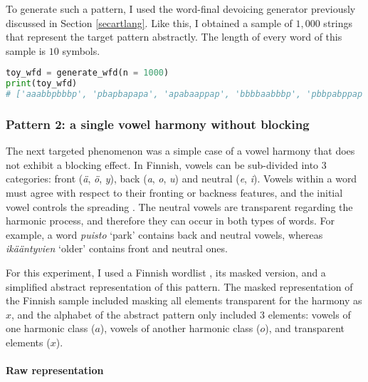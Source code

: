 To generate such a pattern, I used the word-final devoicing generator previously discussed in Section \ref{secartlang}.
Like this, I obtained a sample of $1,000$ strings that represent the target pattern abstractly.
The length of every word of this sample is $10$ symbols.

\begin{lstlisting}[language=Python]
toy_wfd = generate_wfd(n = 1000)
print(toy_wfd)
# ['aaabbpbbbp', 'pbapbapapa', 'apabaappap', 'bbbbaabbbp', 'pbbpabppap', ...]
\end{lstlisting}


\subsubsection{Pattern 2: a single vowel harmony without blocking}

The next targeted phenomenon was a simple case of a vowel harmony that does not exhibit a blocking effect.
In Finnish, vowels can be sub-divided into $3$ categories: front (\emph{\"a}, \emph{\"o}, \emph{y}), back (\emph{a}, \emph{o}, \emph{u}) and neutral (\emph{e}, \emph{i}).
Vowels within a word must agree with respect to their fronting or backness features, and the initial vowel controls the spreading \citep{RoseWalker2011}.
The neutral vowels are transparent regarding the harmonic process, and therefore they can occur in both types of words.
For example, a word \emph{puisto} `park' contains back and neutral vowels, whereas \emph{ik\"a\"antyvien} `older' contains front and neutral ones.

For this experiment, I used a Finnish wordlist \href{https://github.com/douglasbuzatto/WordLists}{\faGithub} \citep{GHdouglasbuzatto}, its masked version, and a simplified abstract representation of this pattern.
The masked representation of the Finnish sample included masking all elements transparent for the harmony as $x$, and the alphabet of the abstract pattern only included $3$ elements: vowels of one harmonic class ($a$), vowels of another harmonic class ($o$), and transparent elements ($x$).


\paragraph{Raw representation}

